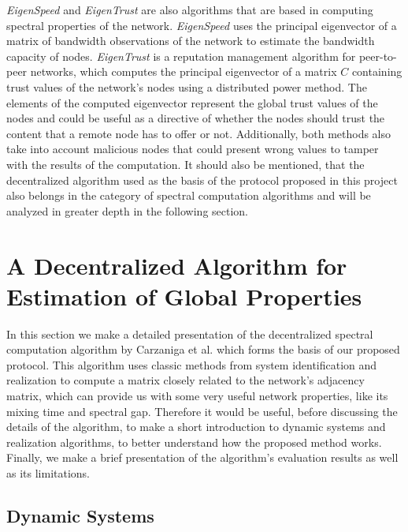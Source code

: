 \documentclass[a4paper,11pt,twoside]{report}
\begin{document}
\textit{EigenSpeed}  \cite{Snader:2009:ESP:1855663.1855672} and \textit{EigenTrust}  \cite{Kamvar:2003:EAR:775152.775242} are also algorithms that are based in computing spectral properties of the network. \textit{EigenSpeed} uses the principal eigenvector of a matrix of bandwidth observations of the network to estimate the bandwidth capacity of nodes. \textit{EigenTrust} is a reputation management algorithm for peer-to-peer networks, which computes the principal eigenvector of a matrix $C$ containing trust values of the network's nodes using a distributed power method. The elements of the computed eigenvector represent the global trust values of the nodes and could be useful as a directive of whether the nodes should trust the content that a remote node has to offer or not. Additionally, both methods also take into account malicious nodes that could present wrong values to tamper with the results of the computation. It should also be mentioned, that the decentralized algorithm used as the basis of the protocol proposed in this project also belongs in the category of spectral computation algorithms and will be analyzed in greater depth in the following section.


\section{A Decentralized Algorithm for Estimation of Global Properties}
\label{sec:decentralized_algo}

In this section we make a detailed presentation of the decentralized spectral computation algorithm by Carzaniga et al. \cite{6195806} which forms the basis of our proposed protocol. This algorithm uses classic methods from system identification and realization to compute a matrix closely related to the network's adjacency matrix, which can provide us with some very useful network properties, like its mixing time and spectral gap. Therefore it would be useful, before discussing the details of the algorithm, to make a short introduction to dynamic systems and realization algorithms, to better understand how the proposed method works. Finally, we make a brief presentation of the algorithm's evaluation results as well as its limitations.

\subsection{Dynamic Systems}
\end{document}
